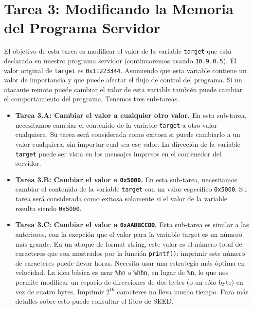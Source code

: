 \section{Tarea 3: Modificando la Memoria del Programa Servidor}

El objetivo de esta tarea es modificar el valor de la variable \texttt{target} que está declarada en nuestro programa servidor (continuaremos usando \texttt{10.9.0.5}).
El valor original de \texttt{target} es \texttt{0x11223344}. 
Asumiendo que esta variable contiene un valor de importancia y que puede afectar el flujo de control del programa. Si un atacante remoto puede cambiar el valor de esta variable también puede cambiar el comportamiento del programa. Tenemos tres sub-tareas.

\begin{itemize} 
\item \textbf{Tarea 3.A: Cambiar el valor a cualquier otro valor.}
En esta sub-tarea, necesitamos cambiar el contenido de la variable \texttt{target} a otro valor cualquiera. Su tarea será considerada como exitosa si puede cambiarlo a un valor cualquiera, sin importar cual sea ese valor. La dirección de la variable \texttt{target} puede ser vista en los mensajes impresos en el contenedor del servidor.


\item \textbf{Tarea 3.B: Cambiar el valor a \texttt{0x5000}.}  
En esta sub-tarea, necesitamos cambiar el contenido de la variable  \texttt{target} con un valor específico \texttt{0x5000}. Su tarea será considerada como exitosa solamente si el valor de la variable resulta siendo \texttt{0x5000}.


\item \textbf{Tarea 3.C: Cambiar el valor a \texttt{0xAABBCCDD}.}  
Esta sub-tarea es similar a las anteriores, con la exepción que el valor para la variable target es un número más grande. En un ataque de format string, este valor es el número total de caracteres que son mostrados por la función \texttt{printf()}; imprimir este número de caracteres puede llevar horas. Necesita usar una estrategia más óptima en velocidad.
La idea básica es usar  \texttt{\%hn} o \texttt{\%hhn}, en lugar de \texttt{\%n}, lo que nos permite modificar un espacio de direcciones de dos bytes (o un sólo byte) en vez de cuatro bytes. Imprimir $2^{16}$ caracteres no lleva mucho tiempo.
Para más detalles sobre esto puede consultar el libro de SEED.
\end{itemize} 



